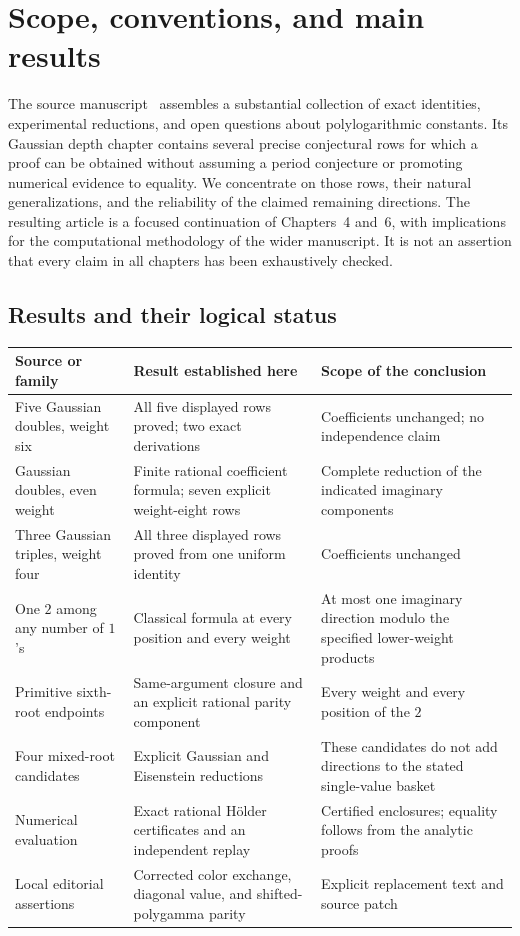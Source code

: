 \section{Scope, conventions, and main results}

The source manuscript~\cite{ProveIt2026} assembles a substantial collection of exact
identities, experimental reductions, and open questions about
polylogarithmic constants. Its Gaussian depth chapter contains several
precise conjectural rows for which a proof can be obtained without
assuming a period conjecture or promoting numerical evidence to equality.
We concentrate on those rows, their natural generalizations, and the
reliability of the claimed remaining directions. The resulting article
is a focused continuation of Chapters~4 and~6, with implications for the
computational methodology of the wider manuscript. It is not an assertion
that every claim in all chapters has been exhaustively checked.

\subsection{Results and their logical status}

\begin{center}
\small
\begin{tabular}{@{}P{0.25\textwidth}P{0.34\textwidth}P{0.33\textwidth}@{}}
\toprule
Source or family & Result established here & Scope of the conclusion\\
\midrule
Five Gaussian doubles, weight six & All five displayed rows proved;
two exact derivations & Coefficients unchanged; no independence claim\\[4pt]
Gaussian doubles, even weight & Finite rational coefficient formula;
seven explicit weight-eight rows & Complete reduction of the indicated
imaginary components\\[4pt]
Three Gaussian triples, weight four & All three displayed rows proved
from one uniform identity & Coefficients unchanged\\[4pt]
One $2$ among any number of $1$'s & Classical formula at every position
and every weight & At most one imaginary direction modulo the specified
lower-weight products\\[4pt]
Primitive sixth-root endpoints & Same-argument closure and an explicit
rational parity component & Every weight and every position of the $2$\\[4pt]
Four mixed-root candidates & Explicit Gaussian and Eisenstein reductions
& These candidates do not add directions to the stated single-value basket\\[4pt]
Numerical evaluation & Exact rational H\"older certificates and an
independent replay & Certified enclosures; equality follows from the
analytic proofs\\[4pt]
Local editorial assertions & Corrected color exchange, diagonal value,
and shifted-polygamma parity & Explicit replacement text and source patch\\
\bottomrule
\end{tabular}
\end{center}

